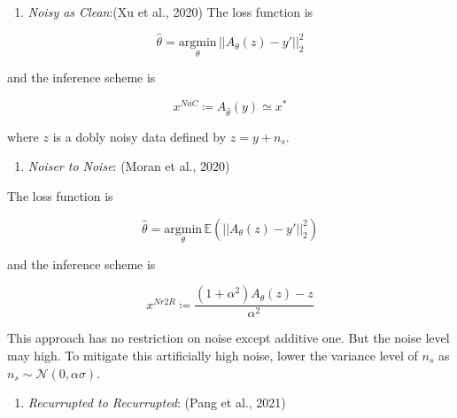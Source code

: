 \documentclass[
]{agujournal2019}
\providecommand{\tightlist}{%
  \setlength{\itemsep}{0pt}\setlength{\parskip}{0pt}}\usepackage{longtable,booktabs,array}
\begin{document}
\begin{enumerate}
\def\labelenumi{\arabic{enumi}.}
\setcounter{enumi}{1}
\tightlist
\item
  \emph{Noisy as Clean}:(Xu et al., 2020) The loss function is
\end{enumerate}

\[ \hat{\theta}=\underset{\theta}{\mathrm{argmin}}\, ||A_\theta (z)-y'||^2_2\]

and the inference scheme is

\[x^{NaC}\coloneqq A_{\hat{\theta}}(y)\simeq x^*\]

where \(z\) is a dobly noisy data defined by \(z=y+n_s\).

\begin{enumerate}
\def\labelenumi{\arabic{enumi}.}
\setcounter{enumi}{2}
\tightlist
\item
  \emph{Noiser to Noise}: (Moran et al., 2020)
\end{enumerate}

The loss function is

\[ \hat{\theta}=\underset{\theta}{\mathrm{argmin}}\,\mathbb{E} \left(||A_\theta (z)-y'||^2_2\right)\]

and the inference scheme is

\[x^{Nr2R}\coloneqq \frac{(1+\alpha^2)A_\theta(z)-z}{\alpha^2}\]

\begin{tcolorbox}[enhanced jigsaw, rightrule=.15mm, coltitle=black, bottomtitle=1mm, breakable, arc=.35mm, toprule=.15mm, colback=white, title=\textcolor{quarto-callout-note-color}{\faInfo}\hspace{0.5em}{Note}, colframe=quarto-callout-note-color-frame, opacitybacktitle=0.6, leftrule=.75mm, toptitle=1mm, bottomrule=.15mm, titlerule=0mm, left=2mm, opacityback=0, colbacktitle=quarto-callout-note-color!10!white]

This approach has no restriction on noise except additive one. But the
noise level may high. To mitigate this artificially high noise, lower
the variance level of \(n_s\) as
\(n_s\sim \mathcal{N}(0,\alpha\sigma)\).

\end{tcolorbox}

\begin{enumerate}
\def\labelenumi{\arabic{enumi}.}
\setcounter{enumi}{3}
\tightlist
\item
  \emph{Recurrupted to Recurrupted}: (Pang et al., 2021)
\end{enumerate}
\end{document}
